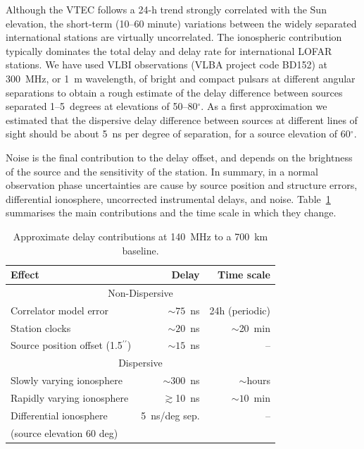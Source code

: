 \documentclass[graybox]{svmult}
\begin{document}
Although the VTEC follows a 24-h trend strongly correlated with the Sun
elevation, the short-term (10--60 minute) variations between the widely
separated international stations are virtually uncorrelated.  The ionospheric
contribution typically dominates the total delay and delay rate for
international LOFAR stations.  We have used VLBI observations (VLBA project
code BD152) at 300~MHz, or 1~m wavelength, of bright and compact pulsars at
different angular separations to obtain a rough estimate of the delay difference
between sources separated 1--5~degrees at elevations of 50--80$^{\circ}$. As a
first approximation we estimated that the dispersive delay difference between
sources at different lines of sight should be about 5~ns per degree of
separation, for a source elevation of 60$^{\circ}$.

Noise is the final contribution to the delay offset, and depends on the
brightness of the source and the sensitivity of the station. In summary, in a
normal observation phase uncertainties are cause by source position
and structure errors, differential ionosphere, uncorrected instrumental delays,
and noise. Table~\ref{tab:expecteddelay} summarises the main contributions and
the time scale in which they change. 

\begin{table}
\caption{Approximate delay contributions at 140~MHz to a 700~km baseline.}             %
\label{tab:expecteddelay}
\centering
\begin{tabular}{l r r}
\hline\hline
Effect  & Delay  & Time scale \\
\hline
     \multicolumn{3}{c}{Non-Dispersive}   \\
\hline
Correlator model error      & $\sim75$~ns         &  24h (periodic)   \\
Station clocks              & $\sim20$~ns        & $\sim$20~min \\
Source position offset (1.5$^{\prime\prime}$)        & $\sim15$~ns        & --  \\
\hline
     \multicolumn{3}{c}{Dispersive}   \\
\hline
Slowly varying ionosphere   & $\sim300$~ns      & $\sim$hours \\
Rapidly varying ionosphere  & $\gtrsim$10~ns         & $\sim10$~min  \\
Differential ionosphere     & 5~ns/deg sep.      & -- \\
(source elevation 60 deg)   &                    &  \\

\hline                                   %
\end{tabular}
\end{table}
%
\end{document}
